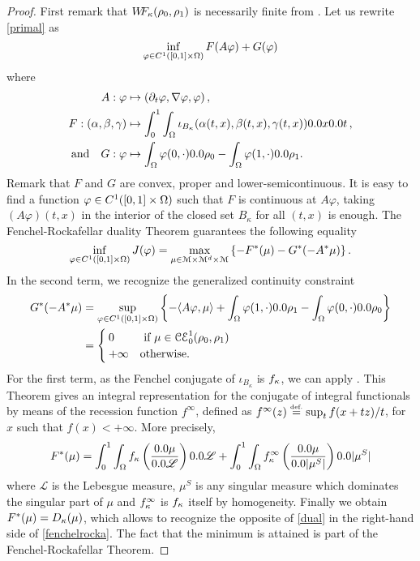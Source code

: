 \begin{proof}
First remark that $W\! \! F_{\kappa}(\rho_0,\rho_1)$ is necessarily finite from . Let us rewrite \eqref{primal} as 
\[
\inf_{\varphi \in C^1([0,1] \times \Omega)} F(A\varphi) + G(\varphi)
\]
where
\begin{align*}
A : \varphi &\mapsto (\D_t \varphi, \nabla \varphi, \varphi)\, , \\
F :(\alpha,\beta,\gamma) &\mapsto \int_0^1 \int_{\Om} \iota_{B_{\kappa}}(\alpha(t,x),\beta(t,x),\gamma(t,x)) \d x \d t \, , \\
 \text{and} \quad G : \varphi &\mapsto \int_{\Om} \varphi(0,\cdot)\d\rho_0 - \int_{\Om} \varphi(1,\cdot) \d\rho_1 .
\end{align*}
Remark that $F$ and $G$ are convex, proper and lower-semicontinuous. It is easy to find a function $\varphi \in C^1([0,1]\times \Omega)$ such that $F$ is continuous at $A\varphi$, taking $(A\varphi)(t,x)$ in the interior of the closed set $B_{\kappa}$ for all $(t,x)$ is enough. The Fenchel-Rockafellar duality Theorem guarantees the following equality
\begin{equation}
\inf_{\varphi \in C^1([0,1] \times \Om)} J(\varphi) = \max_{\mu \in \mathcal{M} \times \mathcal{M}^{d} \times \mathcal{M}} 
\left\{ -F^*(\mu)-G^*(-A^*\mu) \right\}.
\label{fenchelrocka}
\end{equation}
In the second term, we recognize the generalized continuity constraint
\begin{align*}
G^*(-A^*\mu) &= \sup_{\varphi \in C^1([0,1]\times \Om)} \left\{ - \langle A\varphi, \mu \rangle    +\int_{\Om} \varphi(1,\cdot)\d\rho_1 - \int_{\Om} \varphi(0,\cdot) \d\rho_0 \right\}  \\
 &= 
\begin{cases}
0 & \text{ if $\mu \in \ccons$}\\
+\infty & \text{otherwise}.
\end{cases}
\end{align*}
For the first term, as the Fenchel conjugate of $\iota_{B_{\kappa}}$ is $f_{\kappa}$, we can apply \cite[Theorem 5]{rockafellar1971integrals}. This Theorem gives an integral representation for the conjugate of integral functionals by means of the recession function $f^{\infty}$, defined as $f^{\infty}(z) \stackrel{\mbox{\upshape\tiny def.}}{=} \sup_t f(x+tz)/t$, for $x$ such that $f(x)<+\infty$. More precisely,
\[
F^*(\mu) = \int_0^1 \int_{\Om} \fonc \left( \frac{\d\mu}{\d\mathscr{L}} \right) \d \mathscr{L}+
\int_0^1 \int_{\Om} \fonc^{\infty} \left( \frac{\d\mu}{\d|\mu^S|} \right) \d|\mu^S|
\]
where $\mathscr{L}$ is the Lebesgue measure, $\mu^S$ is any singular measure which dominates the singular part of $\mu$ and $f_{\kappa}^{\infty}$ is $f_{\kappa}$ itself by homogeneity. Finally we obtain $F^*(\mu)=D_{\kappa}(\mu)$, which allows to recognize the opposite of \eqref{dual} in the right-hand side of \eqref{fenchelrocka}. The fact that the minimum is attained is part of the Fenchel-Rockafellar Theorem.
\end{proof}

